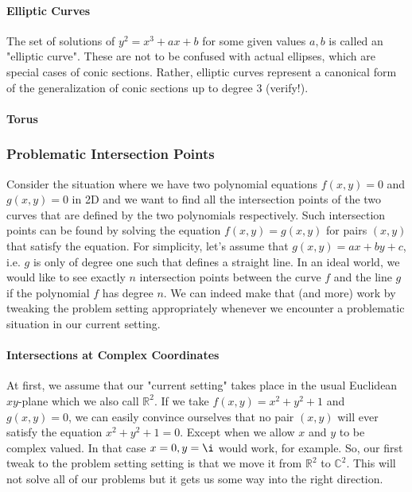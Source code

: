 \paragraph{Elliptic Curves}
The set of solutions of $y^2 = x^3 + a x + b$ for some given values $a,b$ is called an "elliptic curve". These are not to be confused with actual ellipses, which are special cases of conic sections. Rather, elliptic curves represent a canonical form of the generalization of conic sections up to degree 3 (verify!).



\paragraph{Torus}








\subsubsection{Problematic Intersection Points}
Consider the situation where we have two polynomial equations $f(x,y) = 0$ and $g(x,y) = 0$ in 2D and we want to find all the intersection points of the two curves that are defined by the two polynomials respectively. Such intersection points can be found by solving the equation $f(x,y) = g(x,y)$ for pairs $(x,y)$ that satisfy the equation. For simplicity, let's assume that $g(x,y) = ax + by + c$, i.e. $g$ is only of degree one such that defines a straight line. In an ideal world, we would like to see exactly $n$ intersection points between the curve $f$ and the line $g$ if the polynomial $f$ has degree $n$. We can indeed make that (and more) work by tweaking the problem setting appropriately whenever we encounter a problematic situation in our current setting.

\paragraph{Intersections at Complex Coordinates}
At first, we assume that our "current setting" takes place in the usual Euclidean $xy$-plane which we also call $\mathbb{R}^2$. If we take $f(x,y) = x^2 + y^2 + 1$ and $g(x,y) = 0$, we can easily convince ourselves that no pair $(x,y)$ will ever satisfy the equation $x^2 + y^2 + 1 = 0$. Except when we allow $x$ and $y$ to be complex valued. In that case $x = 0, y = \i$ would work, for example. So, our first tweak to the problem setting setting is that we move it from $\mathbb{R}^2$ to $\mathbb{C}^2$. This will not solve all of our problems but it gets us some way into the right direction.

